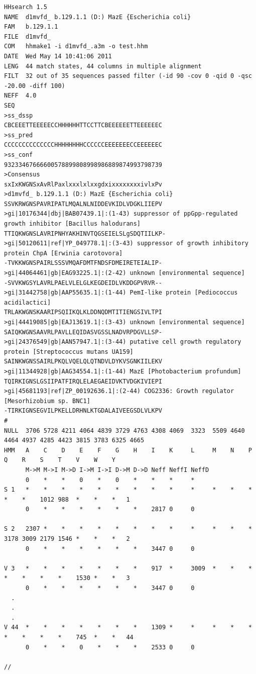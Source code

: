 \documentclass[11pt,a4paper]{article}
\begin{document}
\scriptsize
\begin{verbatim}
HHsearch 1.5
NAME  d1mvfd_ b.129.1.1 (D:) MazE {Escherichia coli}
FAM   b.129.1.1
FILE  d1mvfd_
COM   hhmake1 -i d1mvfd_.a3m -o test.hhm 
DATE  Wed May 14 10:41:06 2011
LENG  44 match states, 44 columns in multiple alignment
FILT  32 out of 35 sequences passed filter (-id 90 -cov 0 -qid 0 -qsc -20.00 -diff 100)
NEFF  4.0 
SEQ
>ss_dssp
CBCEEETTEEEEECCHHHHHHTTCCTTCBEEEEEETTEEEEEEC
>ss_pred
CCCCCCCCCCCCCCHHHHHHHHCCCCCCEEEEEEECCEEEEEEC
>ss_conf
93233467666600578899808998986889874993798739
>Consensus
sxIxKWGNSxAvRlPaxlxxxlxlxxgdxixxxxxxxxivlxPv
>d1mvfd_ b.129.1.1 (D:) MazE {Escherichia coli}
SSVKRWGNSPAVRIPATLMQALNLNIDDEVKIDLVDGKLIIEPV
>gi|10176344|dbj|BAB07439.1|:(1-43) suppressor of ppGpp-regulated growth inhibitor [Bacillus halodurans]
TTIQKWGNSLAVRIPNHYAKHINVTQGSEIELSLgSDQTIILKP-
>gi|50120611|ref|YP_049778.1|:(3-43) suppressor of growth inhibitory protein ChpA [Erwinia carotovora]
-TVKKWGNSPAIRLSSSVMQAFDMTFNDSFDMEIRETEIALIP-
>gi|44064461|gb|EAG93225.1|:(2-42) unknown [environmental sequence]
-SVVKWGSYLAVRLPAELVLELGLKEGDEIDLVKDDGPVRVR--
>gi|31442758|gb|AAP55635.1|:(1-44) PemI-like protein [Pediococcus acidilactici]
TRLAKWGNSKAARIPSQIIKQLKLDDNQDMTITIENGSIVLTPI
>gi|44419085|gb|EAJ13619.1|:(3-43) unknown [environmental sequence]
SAIQKWGNSAAVRLPAVLLEQIDASVGSSLNADVRPDGVLLSP-
>gi|24376549|gb|AAN57947.1|:(3-44) putative cell growth regulatory protein [Streptococcus mutans UA159]
SAINKWGNSSAIRLPKQLVQELQLQTNDVLDYKVSGNKIILEKV
>gi|11344928|gb|AAG34554.1|:(1-44) MazE [Photobacterium profundum]
TQIRKIGNSLGSIIPATFIRQLELAEGAEIDVKTVDGKIVIEPI
>gi|45681193|ref|ZP_00192636.1|:(2-44) COG2336: Growth regulator [Mesorhizobium sp. BNC1]
-TIRKIGNSEGVILPKELLDRHNLKTGDALAIVEEGSDLVLKPV
#
NULL  3706 5728 4211 4064 4839 3729 4763 4308 4069  3323  5509 4640 4464 4937 4285 4423 3815 3783 6325 4665
HMM   A    C    D    E    F    G    H    I    K     L     M    N    P    Q    R    S    T    V    W    Y
      M->M M->I M->D I->M I->I D->M D->D Neff NeffI NeffD
      0    *    *    0    *    0    *    *    *     *
S 1   *    *    *    *    *    *    *    *    *     *     *    *    *    *    *    1012 988  *    *    *   1
      0    *    *    *    *    *    *    2817 0     0

S 2   2307 *    *    *    *    *    *    *    *     *     *    *    *    3178 3009 2179 1546 *    *    *   2
      0    *    *    *    *    *    *    3447 0     0

V 3   *    *    *    *    *    *    *    917  *     3009  *    *    *    *    *    *    *    1530 *    *   3
      0    *    *    *    *    *    *    3447 0     0
  .
  .
  .
V 44  *    *    *    *    *    *    *    1309 *     *     *    *    *    *    *    *    *    745  *    *   44
      0    *    *    0    *    *    *    2533 0     0

//
\end{verbatim}
\normalsize
\end{document}
